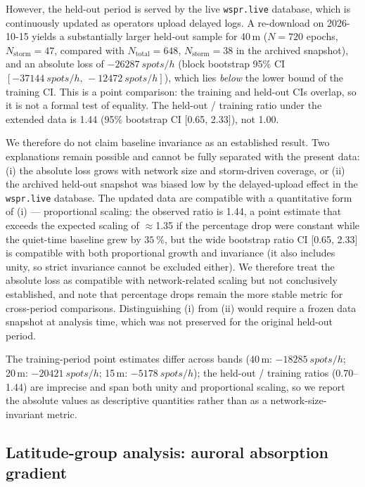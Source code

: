 \documentclass{agujournal2019}
\begin{document}
However, the held-out period is served by the live \texttt{wspr.live}
database, which is continuously updated as operators upload delayed
logs. A re-download on 2026-10-15 yields a substantially larger held-out
sample for 40\,m ($N = 720$ epochs, $N_{\text{storm}} = 47$, compared
with $N_{\text{total}} = 648$, $N_{\text{storm}} = 38$ in the archived
snapshot), and an absolute loss of $\SI{-26287}{spots/h}$ (block
bootstrap 95\% CI $[-\SI{37144}{spots/h},\, -\SI{12472}{spots/h}]$),
which lies \emph{below} the lower bound of the training CI. This is a
point comparison: the training and held-out CIs overlap, so it is not a
formal test of equality. The held-out / training ratio under the
extended data is 1.44 (95\% bootstrap CI [0.65, 2.33]), not 1.00.

We therefore do not claim baseline invariance as an established result.
Two explanations remain possible and cannot be fully separated with the
present data: (i) the absolute loss grows with network size and
storm-driven coverage, or (ii) the archived held-out snapshot was
biased low by the delayed-upload effect in the \texttt{wspr.live}
database. The updated data are compatible with a quantitative form of (i) ---
proportional scaling: the observed ratio is 1.44, a point estimate that
exceeds the expected scaling of $\approx$1.35 if the percentage drop
were constant while the quiet-time baseline grew by
$\SI{+35}{\percent}$, but the wide bootstrap ratio CI [0.65, 2.33] is
compatible with both proportional growth and invariance (it also
includes unity, so strict invariance cannot be excluded either).
We therefore treat the absolute loss as compatible with network-related
scaling but not conclusively established, and note that percentage drops
remain the more stable metric for cross-period comparisons.
Distinguishing (i) from (ii) would require a frozen data snapshot at
analysis time, which was not preserved for the original held-out period.

The training-period point estimates differ across bands
(40\,m: $\SI{-18285}{spots/h}$; 20\,m: $\SI{-20421}{spots/h}$;
15\,m: $\SI{-5178}{spots/h}$); the held-out / training ratios
(0.70--1.44) are imprecise and span both unity and proportional
scaling, so we report the absolute values as descriptive quantities
rather than as a network-size-invariant metric.


\subsection{Latitude-group analysis: auroral absorption gradient}
\label{sec:spatial}
\end{document}
